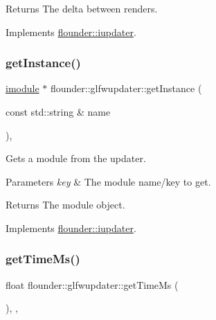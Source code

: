 \begin{DoxyReturn}{Returns}
The delta between renders. 
\end{DoxyReturn}


Implements \hyperlink{classflounder_1_1iupdater_a242d2c4bef63ac11560ac4f13dd4ad3f}{flounder\+::iupdater}.

\mbox{\label{classflounder_1_1glfwupdater_a284945635b93ffc1bd6164ff20565349}} 
\subsubsection{\texorpdfstring{get\+Instance()}{getInstance()}}
{\footnotesize\ttfamily \hyperlink{classflounder_1_1imodule}{imodule} $\ast$ flounder\+::glfwupdater\+::get\+Instance (\begin{DoxyParamCaption}\item[{const std\+::string \&}]{name }\end{DoxyParamCaption})\hspace{0.3cm}{\ttfamily [override]}, {\ttfamily [virtual]}}



Gets a module from the updater. 


\begin{DoxyParams}{Parameters}
{\em key} & The module name/key to get. \\
\hline
\end{DoxyParams}
\begin{DoxyReturn}{Returns}
The module object. 
\end{DoxyReturn}


Implements \hyperlink{classflounder_1_1iupdater_a391b1788b5c139b199ed48033da1b88d}{flounder\+::iupdater}.

\mbox{\label{classflounder_1_1glfwupdater_ac27f7a962d72e4dff8e13db7d84647ba}} 
\subsubsection{\texorpdfstring{get\+Time\+Ms()}{getTimeMs()}}
{\footnotesize\ttfamily float flounder\+::glfwupdater\+::get\+Time\+Ms (\begin{DoxyParamCaption}{ }\end{DoxyParamCaption})\hspace{0.3cm}{\ttfamily [inline]}, {\ttfamily [override]}, {\ttfamily [virtual]}}



